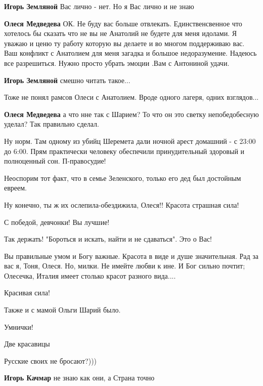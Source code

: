 \begin{itemize}
\begin{itemize}
\textbf{Игорь Земляной} Вас лично - нет. Но я Вас лично и не знаю

\textbf{Олеся Медведева} ОК. Не буду вас больше отвлекать. Единственсвенное что
хотелось бы сказать что не вы не Анатолий не будете для меня идолами. Я уважаю и
ценю ту работу которую вы делаете и во многом поддерживаю вас. Ваш конфликт с
Анатолием для меня загадка и большое недоразумение. Надеюсь все
разрешиться. Нужно просто убрать эмоции .Вам с Антониной удачи.

\textbf{Игорь Земляной} смешно читать такое...

Тоже не понял рамсов Олеси с Анатолием. Вроде одного лагеря, одних взглядов...

\textbf{Олеся Медведева} а что нне так с Шарием? То что он это светку непобедобесную уделал? Так правильно сделал.
\end{itemize} %


Ну норм. Там одному из убийц Шеремета дали ночной арест домашний - с 23:00 до
6:00. Прям практически человеку обеспечили принудительный здоровый и
полноценный сон. П-правосудие!

Неоспорим тот факт, что в семье Зеленского, только его дед был достойным евреем.

Ну конечно, ты ж их ослепила-обездижила, Олеся!! Красота страшная сила!

С победой, девчонки! Вы лучшие!

Так держать! "Бороться и искать, найти и не сдаваться". Это о Вас!


Вы правильные умом и Богу важные. Красота в виде и душе значительная. Рад за
вас я, Тоня, Олеся. Но, милки. Не имейте любви к ине. И Бог сильно почтит;
Олесечка, Италия имеет столько красот разного вида....

Красивая сила!

Также и с мамой Ольги Шарий было.

Умнички!

Две красавицы

Русские своих не бросают?)))

\begin{itemize} %
\textbf{Игорь Качмар} не знаю как они, а Страна точно


\end{itemize}
\end{itemize}
